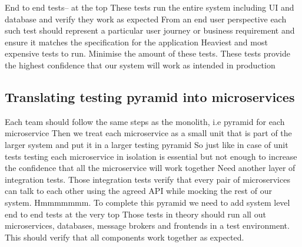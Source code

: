 \documentclass[a4paper, 11pt]{book}
\begin{document}
    End to end tests-- at the top
    These tests run the entire system including UI and database and verify they work as expected
    From an end user perspective each such test should represent a particular user journey or business requirement and ensure it matches the specification for the application
    Heaviest and most expensive tests to run.
    Minimise the amount of these tests.
    These tests provide the highest confidence that our system will work as intended in production

    \subsection{Translating testing pyramid into microservices}
    Each team should follow the same steps as the monolith, i.e pyramid for each microservice
    Then we treat each microservice as a small unit that is part of the larger system and put it in a larger testing pyramid
    So just like in case of unit tests testing each microservice in isolation is essential but not enough to increase the confidence that all the microservice will work together
    Need another layer of integration tests.
    Those integration tests verify that every pair of microservices can talk to each other using the agreed API while mocking the rest of our system. Hmmmmmmm.
    To complete this pyramid we need to add system level end to end tests at the very top
    Those tests in theory should run all out microservices, databases, message brokers and frontends in a test environment.
    This should verify that all components work together as expected.
\end{document}
